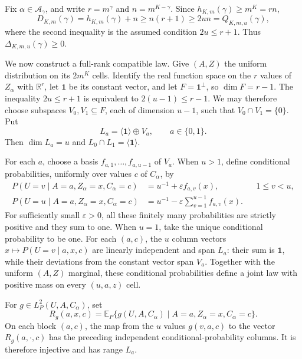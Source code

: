 Fix \(\alpha\in\mathcal A_\gamma\), and write \(r=m^\gamma\) and \(n=m^{K-\gamma}\). Since \(h_{K,m}(\gamma)\ge m^K=rn\),
\[D_{K,m}(\gamma)=h_{K,m}(\gamma)+n\ge n(r+1)\ge2un=Q_{K,m,u}(\gamma),\]
where the second inequality is the assumed condition \(2u\le r+1\). Thus \(\Delta_{K,m,u}(\gamma)\ge0\).

We now construct a full-rank compatible law. Give \((A,Z)\) the uniform distribution on its \(2m^K\) cells. Identify the real function space on the \(r\) values of \(Z_\alpha\) with \(\mathbb R^r\), let \(\mathbf 1\) be its constant vector, and let \(F=\mathbf 1^\perp\), so \(\dim F=r-1\). The inequality \(2u\le r+1\) is equivalent to \(2(u-1)\le r-1\). We may therefore choose subspaces \(V_0,V_1\subseteq F\), each of dimension \(u-1\), such that \(V_0\cap V_1=\{0\}\). Put
\[L_a=\langle\mathbf 1\rangle\oplus V_a,\qquad a\in\{0,1\}.\]
Then \(\dim L_a=u\) and \(L_0\cap L_1=\langle\mathbf 1\rangle\).

For each \(a\), choose a basis \(f_{a,1},\ldots,f_{a,u-1}\) of \(V_a\). When \(u>1\), define conditional probabilities, uniformly over values \(c\) of \(C_\alpha\), by
\[\begin{aligned}P(U=v\mid A=a,Z_\alpha=x,C_\alpha=c)&=u^{-1}+\varepsilon f_{a,v}(x),&&1\le v<u,\\P(U=u\mid A=a,Z_\alpha=x,C_\alpha=c)&=u^{-1}-\varepsilon\sum_{v=1}^{u-1}f_{a,v}(x).\end{aligned}\]
For sufficiently small \(\varepsilon>0\), all these finitely many probabilities are strictly positive and they sum to one. When \(u=1\), take the unique conditional probability to be one. For each \((a,c)\), the \(u\) column vectors \(x\mapsto P(U=v\mid a,x,c)\) are linearly independent and span \(L_a\): their sum is \(\mathbf 1\), while their deviations from the constant vector span \(V_a\). Together with the uniform \((A,Z)\) marginal, these conditional probabilities define a joint law with positive mass on every \((u,a,z)\) cell.

For \(g\in L_P^2(U,A,C_\alpha)\), set
\[R_g(a,x,c)=\mathbb E_P\{g(U,A,C_\alpha)\mid A=a,Z_\alpha=x,C_\alpha=c\}.\]
On each block \((a,c)\), the map from the \(u\) values \(g(v,a,c)\) to the vector \(R_g(a,\cdot,c)\) has the preceding independent conditional-probability columns. It is therefore injective and has range \(L_a\).

